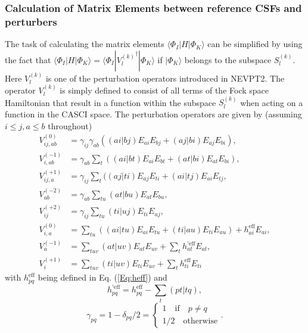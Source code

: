 \subsubsection{Calculation of Matrix Elements between reference CSFs and perturbers}
The task of calculating the matrix elements $\langle {\Phi _I^{}|H|\Phi _K^{}} \rangle $ can be simplified by using the fact that $\langle {\Phi _I^{}|H|\Phi _K^{}} \rangle  = \langle {\Phi _I^{}|V{{_l^{(k)}}^\dag }|\Phi _K^{}} \rangle$ if $| {{\Phi _K}} \rangle $ belongs to the subspace $S_l^{(k)}$. Here $V_l^{(k)}$ is one of the perturbation operators introduced in NEVPT2.\cite{AngelCM_2002_9138} The operator $V_l^{(k)}$ is simply defined to consist of all terms of the Fock space Hamiltonian that result in a function within the subspace $S_l^{(k)}$ when acting on a function in the CASCI space. 
The perturbation operators are given by (assuming $i\leq j, a \leq b$ throughout)
\begin{align}
  V_{ij, ab}^{(0)} &= \gamma_{ij} \gamma_{ab} ((ai|bj) E_{ai} E_{bj} + (aj|bi) E_{aj} E_{bi}), \\
  V_{i, ab}^{(-1)} &= \gamma_{ab} \sum_t ((ai|bt) E_{ai} E_{bt} + (at|bi) E_{at} E_{bi}), \\
  V_{ij, a}^{(+1)} &= \gamma_{ij} \sum_t ((aj|ti) E_{aj} E_{ti} + (ai|tj) E_{ai} E_{tj}, \\
  V_{ab}^{(-2)} &= \gamma_{ab} \sum_{tu} (at|bu) E_{at} E_{bu}, \\
  V_{ij}^{(+2)} &= \gamma_{ij} \sum_{tu} (ti|uj) E_{ti} E_{uj}, \\
  V_{i, a}^{(0)} &= \sum_{tu} ((ai|tu) E_{ai} E_{tu} + (ti|au) E_{ti} E_{au}) + h_{ai}^\text{eff} E_{ai}, \\
  V_a^{(-1)} &= \sum_{tuv} (at|uv) E_{at} E_{uv} + \sum_t h^{\prime\text{eff}}_{at} E_{at}, \\
  V_i^{(+1)} &= \sum_{tuv}(ti|uv) E_{ti}E_{uv} + \sum_t h^\text{eff}_{ti} E_{ti}
\end{align}
with $h^\text{eff}_{pq}$ being defined in Eq. (\ref{Eq:heff}) and
\begin{equation}
  h^{\prime\text{eff}}_{pq} = h^\text{eff}_{pq} - \sum_t (pt|tq),
\end{equation}
\begin{equation}
\gamma_{pq} = 1 - \delta_{pq}/2 = \begin{cases} 1 \quad\text{if} \quad p\neq q \\ 1/2 \quad \text{otherwise} \end{cases}.
\end{equation}
